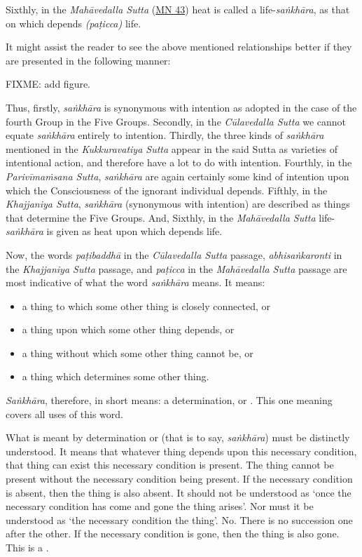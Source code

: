Sixthly, in the \emph{Mahāvedalla Sutta} (\href{https://suttacentral.net/mn43/en/sujato}{MN 43}) heat is called a life-\emph{saṅkhāra}, as that on which depends \emph{(paṭicca)} life.

It might assist the reader to see the above mentioned relationships better if they are presented in the following manner:

FIXME: add figure.

Thus, firstly, \emph{saṅkhāra} is synonymous with intention as adopted in the case of the fourth Group in the Five Groups. Secondly, in the \emph{Cūlavedalla Sutta} we cannot equate \emph{saṅkhāra} entirely to intention. Thirdly, the three kinds of \emph{saṅkhāra} mentioned in the \emph{Kukkuravatiya Sutta} appear in the said Sutta as varieties of intentional action, and therefore have a lot to do with intention. Fourthly, in the \emph{Parivīmaṁsana Sutta}, \emph{saṅkhāra} are again certainly some kind of intention upon which the Consciousness of the ignorant individual depends. Fifthly, in the \emph{Khajjaniya Sutta}, \emph{saṅkhāra} (synonymous with intention) are described as things that determine the Five Groups. And, Sixthly, in the \emph{Mahāvedalla Sutta} life-\emph{saṅkhāra} is given as heat upon which depends life.

Now, the words \emph{paṭibaddhā} in the \emph{Cūlavedalla Sutta} passage, \emph{abhisaṅkaronti} in the \emph{Khajjaniya Sutta} passage, and \emph{paṭicca} in the \emph{Mahāvedalla Sutta} passage are most indicative of what the word \emph{saṅkhāra} means. It means:

\begin{itemize}
\item
  a thing to which some other thing is closely connected, or
\item
  a thing upon which some other thing depends, or
\item
  a thing without which some other thing cannot be, or
\item
  a thing which determines some other thing.
\end{itemize}

\emph{Saṅkhāra}, therefore, in short means: a determination, or . This one meaning covers all uses of this word.

What is meant by determination or  (that is to say, \emph{saṅkhāra}) must be distinctly understood. It means that whatever thing depends upon this necessary condition, that thing can exist  this necessary condition is present. The thing cannot be present without the necessary condition being present. If the necessary condition is absent, then the thing is also absent. It should not be understood as `once the necessary condition has come and gone the thing arises'. Nor must it be understood as `the necessary condition  the thing'. No. There is no  succession one after the other. If the necessary condition is gone, then the thing is also gone. This is a .

